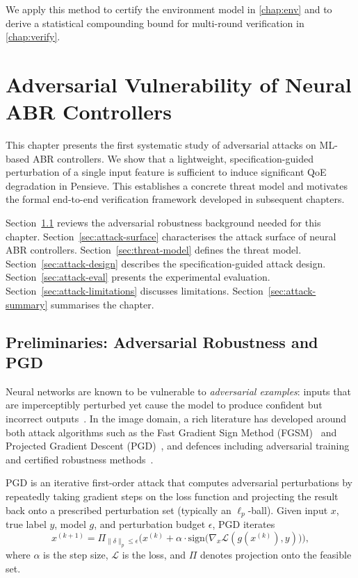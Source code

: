 \documentclass[thesis]{uofithesis} %
\begin{document}
    We apply this method to certify the environment model in
    \ref{chap:env} and to derive a statistical compounding bound
    for multi-round verification in \ref{chap:verify}.

\section{Adversarial Vulnerability of Neural ABR Controllers}
\label{chap:attack}
 
    This chapter presents the first systematic study of adversarial attacks
    on ML-based ABR controllers.  We show that a lightweight,
    specification-guided perturbation of a single input feature is sufficient
    to induce significant QoE degradation in Pensieve. This establishes a
    concrete threat model and motivates the formal end-to-end verification framework
    developed in subsequent chapters.
    
    Section~\ref{sec:attack-prelim} reviews the adversarial robustness
    background needed for this chapter.
    Section~\ref{sec:attack-surface} characterises the attack surface of
    neural ABR controllers.
    Section~\ref{sec:threat-model} defines the threat model.
    Section~\ref{sec:attack-design} describes the specification-guided
    attack design.
    Section~\ref{sec:attack-eval} presents the experimental evaluation.
    Section~\ref{sec:attack-limitations} discusses limitations.
    Section~\ref{sec:attack-summary} summarises the chapter.
    
    
    \subsection{Preliminaries: Adversarial Robustness and PGD}
    \label{sec:attack-prelim}
    
    Neural networks are known to be vulnerable to \emph{adversarial
    examples}: inputs that are imperceptibly perturbed yet cause the model
    to produce confident but incorrect outputs~\cite{attack}.
    In the image domain, a rich literature has developed around both attack
    algorithms such as the Fast Gradient Sign Method
    (FGSM)~\cite{fgsm} and Projected Gradient Descent
    (PGD)~\cite{pgd}, and defences including adversarial
    training~\cite{adversarial-training} and certified robustness
    methods~\cite{certified-robustness}.
    
    PGD is an iterative first-order attack that computes adversarial
    perturbations by repeatedly taking gradient steps on the loss function
    and projecting the result back onto a prescribed perturbation set
    (typically an $\ell_p$-ball).
    Given input $x$, true label $y$, model $g$, and perturbation
    budget $\epsilon$, PGD iterates
    \begin{equation}
        x^{(k+1)} = \Pi_{\lVert \delta \rVert_p \leq \epsilon}
            \!\bigl(x^{(k)} + \alpha \cdot \mathrm{sign}\bigl(\nabla_x
            \mathcal{L}(g(x^{(k)}), y)\bigr)\bigr),
        \label{eq:pgd}
    \end{equation}
    where $\alpha$ is the step size, $\mathcal{L}$ is the loss, and
    $\Pi$ denotes projection onto the feasible set.
    
\end{document}
